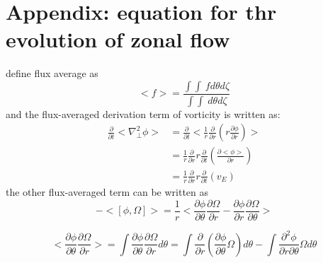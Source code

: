 \documentclass[11pt,a4paper]{article}
\begin{document}
\section{Appendix: equation for thr evolution of zonal flow}

	define flux average as 
	\begin{equation}
		<f>=\frac{\int\int\ fd\theta{d\zeta}}{\int\int\ d\theta{d\zeta}}
	\end{equation}
	and the flux-averaged derivation term of vorticity is written as:
	\begin{equation}
	\begin{aligned}
		\frac{\partial}{\partial{t}}<\nabla_\perp^2\phi>
		&=\frac{\partial}{\partial{t}}<\frac{1}{r}\frac{\partial}{\partial{r}}(r\frac{\partial{\phi}}{\partial{r}})>	\\
		&=\frac{1}{r}\frac{\partial}{\partial{r}}r\frac{\partial}{\partial{t}}(\frac{\partial<\phi>}{\partial{r}})	\\
		&=\frac{1}{r}\frac{\partial}{\partial{r}}r\frac{\partial}{\partial{t}}({v_E})
	\end{aligned}
	\end{equation}
	the other flux-averaged term can be written as
	\begin{equation}
		-<[\phi,\Omega]>
		=\frac{1}{r}<\frac{\partial\phi}{\partial\theta}\frac{\partial\Omega}{\partial{r}}-\frac{\partial\phi}{\partial{r}}\frac{\partial\Omega}{\partial\theta}>
	\end{equation}

	\begin{equation}
		<\frac{\partial\phi}{\partial\theta}\frac{\partial\Omega}{\partial{r}}>
		=\int\frac{\partial\phi}{\partial\theta}\frac{\partial\Omega}{\partial{r}}d\theta
		=\int\frac{\partial}{\partial{r}}(\frac{\partial\phi}{\partial\theta}\Omega)d\theta-\int\frac{\partial^2\phi}{\partial{r}\partial\theta}\Omega{d\theta}
	\end{equation}
	
\end{document}
